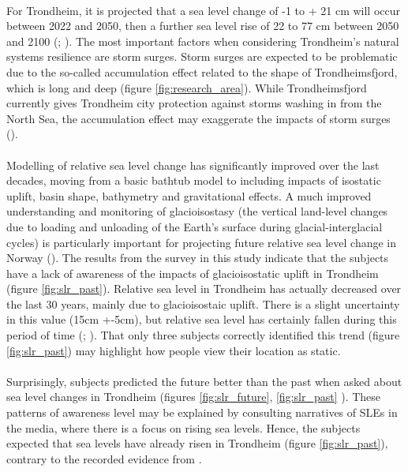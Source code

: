 \paragraph{}

For Trondheim, it is projected that a sea level change of -1 to + 21 cm will occur between 2022 and 2050, then a further sea level rise of 22 to 77 cm between 2050 and 2100 (\cite{hanssen_saksframlegg_2013}; \cite{kartverket_se_2021}). The most important factors when considering Trondheim's natural systems resilience are storm surges. Storm surges are expected to be problematic due to the so-called accumulation effect related to the shape of Trondheimsfjord, which is long and deep  (figure \ref{fig:research_area}). While Trondheimsfjord currently gives Trondheim city protection against storms washing in from the North Sea, the accumulation effect may exaggerate the impacts of storm surges (\cite{hanssen_saksframlegg_2013}). 
\paragraph{}
Modelling of relative sea level change has significantly improved over the last decades, moving from a basic bathtub model to including impacts of isostatic uplift, basin shape,  bathymetry and gravitational effects. A much improved understanding and monitoring of glacioisostasy (the vertical land-level changes due to loading and unloading of the Earth's surface during glacial-interglacial cycles) is particularly important for projecting future relative sea level change in Norway (\cite{breili_high-accuracy_2020}). The results from the survey in this study indicate that the subjects have a lack of awareness of the impacts of glacioisostatic uplift in Trondheim (figure \ref{fig:slr_past}). Relative sea level in Trondheim has actually decreased over the last 30 years, mainly due to glacioisostaic uplift. There is a slight uncertainty in this value (15cm +-5cm), but relative sea level has certainly fallen during this period of time (\cite{breili_high-accuracy_2020}; \cite{kartverket_se_2021}). That only three subjects correctly identified this trend (figure \ref{fig:slr_past}) may highlight how people view their location as static.

\paragraph{}
Surprisingly, subjects predicted the future better than the past when asked about sea level changes in Trondheim (figures \ref{fig:slr_future}, \ref{fig:slr_past} ). These patterns of awareness level may be explained by consulting narratives of SLEs in the media, where there is a focus on rising sea levels. Hence, the subjects expected that sea levels have already risen in Trondheim (figure \ref{fig:slr_past}), contrary to the recorded evidence from \cite{tides_high_2022}.


